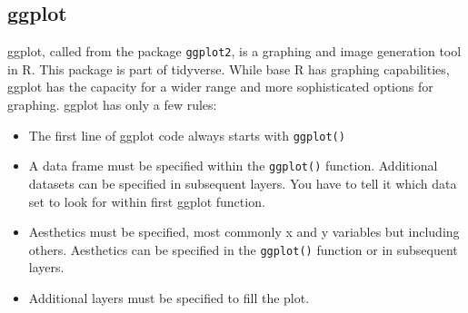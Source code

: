 \documentclass[]{article}
\newenvironment{Shaded}{\begin{snugshade}}{\end{snugshade}}
\newcommand{\KeywordTok}[1]{\textcolor[rgb]{0.13,0.29,0.53}{\textbf{#1}}}
\newcommand{\DataTypeTok}[1]{\textcolor[rgb]{0.13,0.29,0.53}{#1}}
\newcommand{\StringTok}[1]{\textcolor[rgb]{0.31,0.60,0.02}{#1}}
\newcommand{\OperatorTok}[1]{\textcolor[rgb]{0.81,0.36,0.00}{\textbf{#1}}}
\newcommand{\NormalTok}[1]{#1}
\providecommand{\tightlist}{%
  \setlength{\itemsep}{0pt}\setlength{\parskip}{0pt}}
\begin{document}
\begin{Shaded}
\end{Shaded}

\subsection{ggplot}\label{ggplot}

ggplot, called from the package \texttt{ggplot2}, is a graphing and
image generation tool in R. This package is part of tidyverse. While
base R has graphing capabilities, ggplot has the capacity for a wider
range and more sophisticated options for graphing. ggplot has only a few
rules:

\begin{itemize}
\tightlist
\item
  The first line of ggplot code always starts with \texttt{ggplot()}
\item
  A data frame must be specified within the \texttt{ggplot()} function.
  Additional datasets can be specified in subsequent layers. You have to
  tell it which data set to look for within first ggplot function.
\item
  Aesthetics must be specified, most commonly x and y variables but
  including others. Aesthetics can be specified in the \texttt{ggplot()}
  function or in subsequent layers.
\item
  Additional layers must be specified to fill the plot.
\end{itemize}
\end{document}
